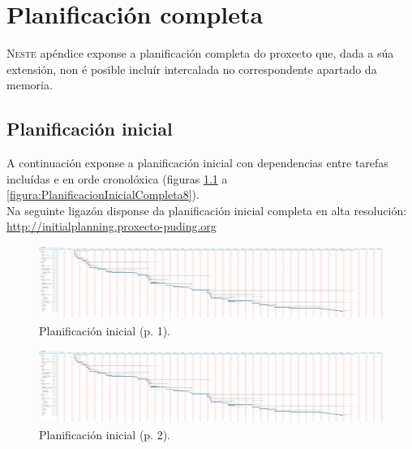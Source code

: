 \chapter{Planificación completa}
\label{chap:planificacion-completa}


\lettrine{N}{este} apéndice exponse a planificación completa do proxecto que,
dada a súa extensión, non é posible incluír intercalada no correspondente
apartado da memoria.

\section{Planificación inicial}

A continuación exponse a planificación inicial con dependencias entre tarefas
incluídas e en orde cronolóxica (figuras
\ref{figura:PlanificacionInicialCompleta1} a
\ref{figura:PlanificacionInicialCompleta8}). \\

Na seguinte ligazón disponse da planificación inicial completa en alta
resolución: \\

\url{http://initialplanning.proxecto-puding.org} \\

\begin{figure}
 \centering
 \includegraphics[trim=0 5cm 213cm 0,clip=true,scale=0.45,keepaspectratio=true]{./imagenes/planificacion-inicial.png}
 \caption{Planificación inicial (p. 1).}
 \label{figura:PlanificacionInicialCompleta1}
\end{figure}

\begin{figure}
 \centering
 \includegraphics[trim=29cm 5cm 181cm 0,clip=true,scale=0.45,keepaspectratio=true]{./imagenes/planificacion-inicial.png}
 \caption{Planificación inicial (p. 2).}
 \label{figura:PlanificacionInicialCompleta2}
\end{figure}

